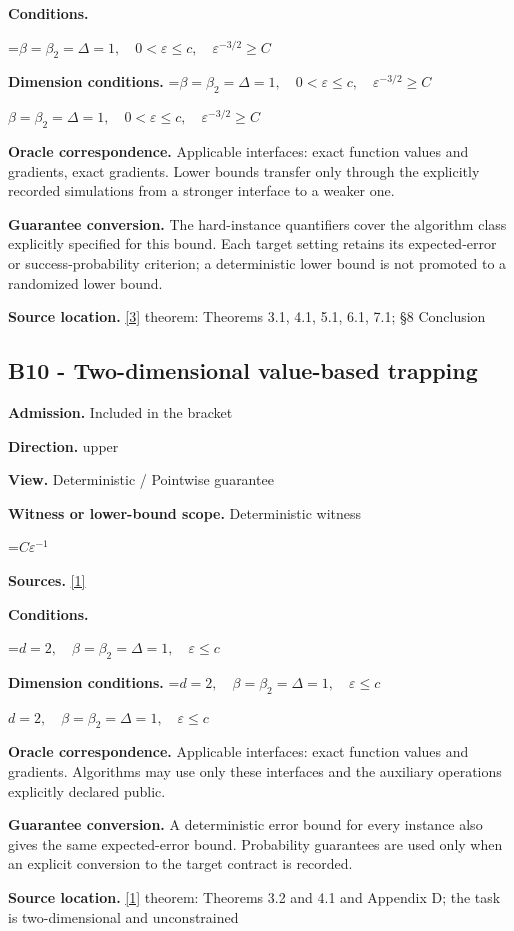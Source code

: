 \documentclass[10pt,a4paper]{article}
\newcommand{\AtlasMath}[1]{\par\begingroup\centering\setbox0=\hbox{$\displaystyle #1$}\ifdim\wd0>1.4\linewidth\typeout{ATLAS WIDE FORMULA: \the\wd0}\fi\ifdim\wd0>\linewidth\resizebox{\linewidth}{!}{\box0}\else\box0\fi\par\endgroup}
\newcommand{\AtlasInlineMath}[1]{\begingroup\setbox0=\hbox{$#1$}\ifdim\wd0>.4\linewidth\endgroup\AtlasMath{#1}\else\endgroup$#1$\fi}
\begin{document}
\textbf{Conditions.} 
\AtlasMath{\beta=\beta_2=\Delta=1,\quad0<\varepsilon\le c,\quad\varepsilon^{-3/2}\ge C}


\textbf{Dimension conditions.} \AtlasInlineMath{\beta=\beta_2=\Delta=1,\quad0<\varepsilon\le c,\quad\varepsilon^{-3/2}\ge C}

\textbf{Oracle correspondence.} Applicable interfaces: exact function values and gradients, exact gradients. Lower bounds transfer only through the explicitly recorded simulations from a stronger interface to a weaker one.

\textbf{Guarantee conversion.} The hard-instance quantifiers cover the algorithm class explicitly specified for this bound. Each target setting retains its expected-error or success-probability criterion; a deterministic lower bound is not promoted to a randomized lower bound.

\textbf{Source location.} \href{https://arxiv.org/abs/2610.16295}{[3]} theorem: Theorems 3.1, 4.1, 5.1, 6.1, 7.1; §8 Conclusion

\subsection{B10 - Two-dimensional value-based trapping}
\textbf{Admission.} Included in the bracket

\textbf{Direction.} upper

\textbf{View.} Deterministic / Pointwise guarantee

\textbf{Witness or lower-bound scope.} Deterministic witness

\AtlasMath{C\varepsilon^{-1}}
\textbf{Sources.} \href{https://arxiv.org/pdf/2310.09157}{[1]}

\textbf{Conditions.} 
\AtlasMath{d=2,\quad\beta=\beta_2=\Delta=1,\quad\varepsilon\le c}


\textbf{Dimension conditions.} \AtlasInlineMath{d=2,\quad\beta=\beta_2=\Delta=1,\quad\varepsilon\le c}

\textbf{Oracle correspondence.} Applicable interfaces: exact function values and gradients. Algorithms may use only these interfaces and the auxiliary operations explicitly declared public.

\textbf{Guarantee conversion.} A deterministic error bound for every instance also gives the same expected-error bound. Probability guarantees are used only when an explicit conversion to the target contract is recorded.

\textbf{Source location.} \href{https://arxiv.org/pdf/2310.09157}{[1]} theorem: Theorems 3.2 and 4.1 and Appendix D; the task is two-dimensional and unconstrained
\end{document}
